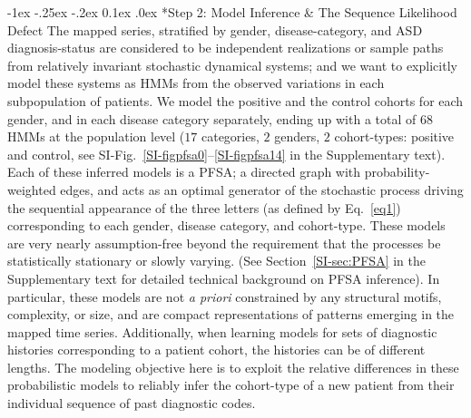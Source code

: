 \documentclass[onecolumn,,10pt]{IEEEtran}
\makeatletter
\renewcommand\subsection{\@startsection {section}{1}{\z@}%
  {-1ex \@plus -.25ex \@minus -.2ex}%
  {0.1ex \@plus.0ex}%
  {\fontsize{11}{12}\selectfont\bfseries\sffamily\color{DodgerBlue4}}}
\def\treatment{positive\xspace}
\makeatother
\begin{document}
\subsection*{Step 2: Model Inference \& The Sequence Likelihood Defect}
The mapped series, stratified by  gender, disease-category, and ASD diagnosis-status are considered to be independent realizations or sample paths from  relatively invariant stochastic dynamical systems; and we want to explicitly model these systems as HMMs from the observed variations in each subpopulation of patients. We model the \treatment and the control cohorts for each gender, and in  each disease category separately, ending up with a total of $68$ HMMs at the population level ($17$ categories, $2$ genders, $2$ cohort-types: \treatment and control, see SI-Fig.~\ref{SI-figpfsa0}--\ref{SI-figpfsa14} in the Supplementary text). Each of these inferred models is  a PFSA;  a directed graph with probability-weighted edges, and acts as an optimal generator of the  stochastic process driving the  sequential appearance of the three letters (as defined by Eq.~\eqref{eq1})  corresponding to each gender, disease category, and cohort-type. These models  are very nearly assumption-free beyond the requirement that  the processes be statistically stationary or slowly varying. (See Section~\ref{SI-sec:PFSA} in the Supplementary text for detailed technical background on PFSA inference).  In particular, these models are not  \textit{a priori}  constrained by any structural motifs, complexity, or size, and are   compact representations of  patterns emerging in the mapped time series. Additionally, when learning models for sets of diagnostic histories corresponding to a patient cohort, the histories can be of different lengths. The modeling objective here is to exploit the relative differences in these  probabilistic  models to reliably infer the cohort-type of a new patient from their  individual sequence  of past diagnostic codes.
\end{document}
